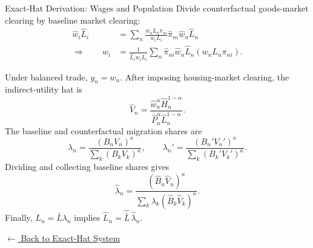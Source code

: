 \documentclass[aspectratio=169,11pt]{beamer}
\newcommand{\wh}[1]{\widehat{#1}}
\newcommand{\backlink}[2]{%
  \hyperlink{#1}{\textcolor{blue1}{\footnotesize
  \(\longleftarrow\) #2}}}
\begin{document}
\begin{frame}[t,label=appHatClosure]{Exact-Hat Derivation: Wages and Population}
  \scriptsize
  \setlength{\abovedisplayskip}{2pt}
  \setlength{\belowdisplayskip}{2pt}
  Divide counterfactual goods-market clearing by baseline market clearing:
  \begin{align*}
    \wh w_i\wh L_i
    &=
    \sum_n
    \frac{w_nL_n\pi_{ni}}{w_iL_i}
    \wh\pi_{ni}\wh w_n\wh L_n
    \\[-1pt]
    \Longrightarrow\qquad
    \wh w_i
    &=
    \frac{1}{\wh L_iw_iL_i}
      \sum_n\wh\pi_{ni}\wh w_n\wh L_n(w_nL_n\pi_{ni}).
  \end{align*}

  Under balanced trade, \(y_n=w_n\). After imposing housing-market clearing,
  the indirect-utility hat is
  \[
    \wh V_n
    =
    \frac{\wh w_n^\alpha\wh H_n^{1-\alpha}}
    {\wh P_n^\alpha\wh L_n^{1-\alpha}}.
  \]
  The baseline and counterfactual migration shares are
  \[
    \lambda_n=\frac{(B_nV_n)^\kappa}
      {\sum_k(B_kV_k)^\kappa},
    \qquad
    \lambda_n'=\frac{(B_n'V_n')^\kappa}
      {\sum_k(B_k'V_k')^\kappa}.
  \]
  Dividing and collecting baseline shares gives
  \[
    \wh\lambda_n
    =\frac{(\wh B_n\wh V_n)^\kappa}
      {\sum_k\lambda_k
      (\wh B_k\wh V_k)^\kappa}.
  \]
  Finally, \(L_n=\bar L\lambda_n\) implies
  \(\wh L_n=\wh{\bar L}\,\wh\lambda_n\).

  \vfill
  \hfill\backlink{mainHatSystem}{Back to Exact-Hat System}
\end{frame}
\end{document}
